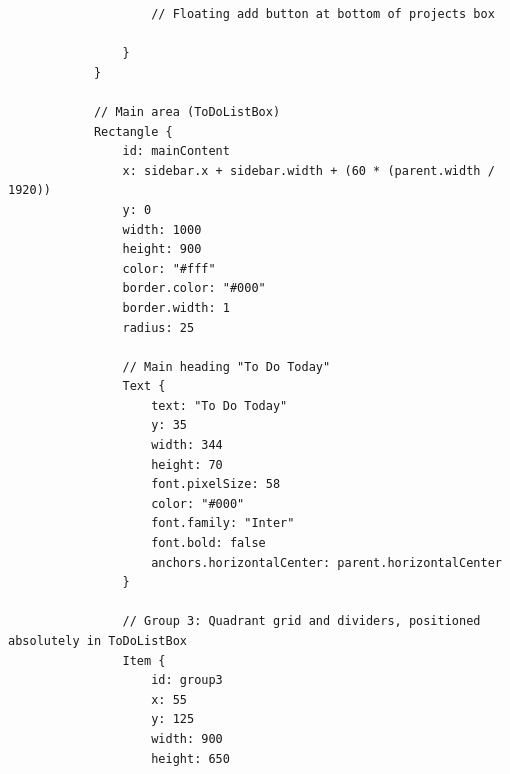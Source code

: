 \documentclass{report}
\begin{document}
\begin{lstlisting}
                    // Floating add button at bottom of projects box

                }
            }

            // Main area (ToDoListBox)
            Rectangle {
                id: mainContent
                x: sidebar.x + sidebar.width + (60 * (parent.width / 1920))
                y: 0
                width: 1000
                height: 900
                color: "#fff"
                border.color: "#000"
                border.width: 1
                radius: 25

                // Main heading "To Do Today"
                Text {
                    text: "To Do Today"
                    y: 35
                    width: 344
                    height: 70
                    font.pixelSize: 58
                    color: "#000"
                    font.family: "Inter"
                    font.bold: false
                    anchors.horizontalCenter: parent.horizontalCenter
                }

                // Group 3: Quadrant grid and dividers, positioned absolutely in ToDoListBox
                Item {
                    id: group3
                    x: 55
                    y: 125
                    width: 900
                    height: 650


\end{lstlisting}
\end{document}
